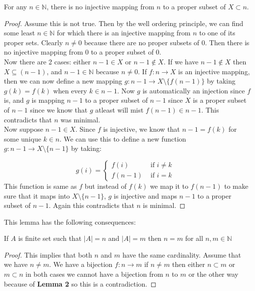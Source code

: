 \documentclass[16pt,a4paper]{article}
\theoremstyle{definition}
\begin{document}
\begin{lemm}{}{}
For any $n\in \mathbb{N}$, there is no injective mapping from $n$ to a proper subset of $X\subset n$. 
\end{lemm}
\begin{proof}
Assume this is not true. Then by the well ordering principle, we can find some least $n\in \mathbb{N}$ for which there is an injective mapping from $n$ to one of its proper sets. Clearly $n\neq 0$ because there are no proper subsets of 0.  Then there is no injective mapping from 0 to a proper subset of 0. 
\\

Now there are 2 cases: either $n-1\in X$ or $n-1\notin X$. If we have $n-1\notin X$ then $X\subseteq (n-1)$, and $n-1 \in \mathbb{N}$ because $n\neq 0$. If $f:n\rightarrow X$ is an injective mapping, then we can now define a new mapping $g:n-1 \rightarrow X\setminus \{f(n-1)\}$ by taking $g(k) = f(k)$ when every $k\in n-1$. Now $g$ is automatically an injection since $f$ is, and $g$ is mapping $n-1$ to a proper subset of $n-1$ since $X$ is a proper subset of $n-1$ since we know that $g$ atleast will mist $f(n-1)\in n-1$. This contradicts that $n$ was minimal. 
\\
Now suppose $n-1\in X$. Since $f$ is injective, we know that $n-1 = f(k)$ for some unique $k\in n$. We can use this to define a new function $g:n-1\rightarrow X\setminus \{n-1\}$ by taking: 

\[
g(i) = 
\begin{cases}
f(i) & \text{ if $i\neq k$}\\
f(n-1) & \text{ if $i = k$ } 
\end{cases}
\]
This function is same as $f$ but instead of $f(k)$ we map it to $f(n-1)$ to make sure that it maps into $X\setminus \{n-1\}$, $g$ is injective and maps $n-1$ to a proper subset of $n-1$. Again this contradicts that $n$ is minimal.   
\end{proof}

This lemma has the following consequences:

\begin{coll}{}{}
If $A$ is finite set such that $|A| = n$ and $|A| = m$ then $n=m$ for all $n,m\in \mathbb{N}$
\end{coll}
\begin{proof}
This implies that both $n$ and $m$ have the same cardinality. Assume that we have $n\neq m$. We have a bijection $f:n\rightarrow m$ if $n\neq m$ then either $n\subset m$ or $m\subset n$ in both cases we cannot have a bijection from $n$ to $m$ or the other way because of \textbf{Lemma 2} so this is a contradiction. 
\end{proof}
\end{document}
